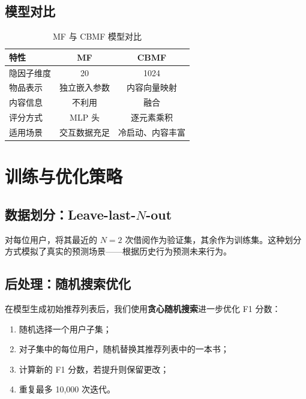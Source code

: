 \documentclass[12pt,a4paper]{article}
\begin{document}
\subsection{模型对比}

\begin{table}[H]
\centering
\caption{MF 与 CBMF 模型对比}
\begin{tabular}{lcc}
\toprule
\textbf{特性} & \textbf{MF} & \textbf{CBMF} \\
\midrule
隐因子维度 & 20 & 1024 \\
物品表示 & 独立嵌入参数 & 内容向量映射 \\
内容信息 & 不利用 & 融合 \\
评分方式 & MLP 头 & 逐元素乘积 \\
适用场景 & 交互数据充足 & 冷启动、内容丰富 \\
\bottomrule
\end{tabular}
\end{table}

\section{训练与优化策略}

\subsection{数据划分：Leave-last-$N$-out}

对每位用户，将其最近的 $N=2$ 次借阅作为验证集，其余作为训练集。这种划分方式模拟了真实的预测场景——根据历史行为预测未来行为。

\subsection{后处理：随机搜索优化}

在模型生成初始推荐列表后，我们使用\textbf{贪心随机搜索}进一步优化 F1 分数：

\begin{enumerate}[leftmargin=2em]
    \item 随机选择一个用户子集；
    \item 对子集中的每位用户，随机替换其推荐列表中的一本书；
    \item 计算新的 F1 分数，若提升则保留更改；
    \item 重复最多 10,000 次迭代。
\end{enumerate}
\end{document}
